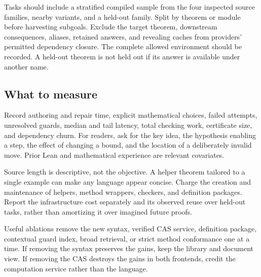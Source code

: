 \documentclass[11pt,a4paper]{article}
\theoremstyle{remark}\newtheorem{example}[proposition]{Example}
\begin{document}
Tasks should include a stratified compiled sample from the four inspected source families, nearby variants, and a held-out family. Split by theorem or module before harvesting subgoals. Exclude the target theorem, downstream consequences, aliases, retained answers, and revealing caches from providers' permitted dependency closure. The complete allowed environment should be recorded. A held-out theorem is not held out if its answer is available under another name.

\subsection{What to measure}
Record authoring and repair time, explicit mathematical choices, failed attempts, unresolved guards, median and tail latency, total checking work, certificate size, and dependency churn. For readers, ask for the key idea, the hypothesis enabling a step, the effect of changing a bound, and the location of a deliberately invalid move. Prior Lean and mathematical experience are relevant covariates.

Source length is descriptive, not the objective. A helper theorem tailored to a single example can make any language appear concise. Charge the creation and maintenance of helpers, method wrappers, checkers, and definition packages. Report the infrastructure cost separately and its observed reuse over held-out tasks, rather than amortizing it over imagined future proofs.

Useful ablations remove the new syntax, verified CAS service, definition package, contextual guard index, broad retrieval, or strict method conformance one at a time. If removing the syntax preserves the gains, keep the library and document view. If removing the CAS destroys the gains in both frontends, credit the computation service rather than the language.
\end{document}
